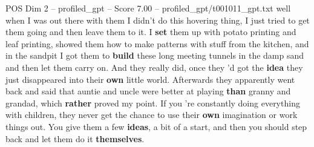 \begin{textsample}{POS Dim 2 – profiled\_gpt – Score 7.00 – profiled\_gpt/t001011\_gpt.txt}  \label{ex:f2_pos_007}
well when I was out there with them I didn't do this hovering thing, I just tried to get them going and then leave them to it.
I \textbf{set} them up with potato printing and leaf printing, showed them how to make patterns with stuff from the kitchen, and in the sandpit I got them to \textbf{build} these long meeting tunnels in the damp sand and then let them carry on.
And they really did, once they ’d got the \textbf{idea} they just disappeared into their \textbf{own} little world.
Afterwards they apparently went back and said that auntie and uncle were better at playing \textbf{than} granny and grandad, which \textbf{rather} proved my point.
If you ’re constantly doing everything with children, they never get the chance to use their \textbf{own} imagination or work things out.
You give them a few \textbf{ideas}, a bit of a start, and then you should step back and let them do it \textbf{themselves}.

\end{textsample}
